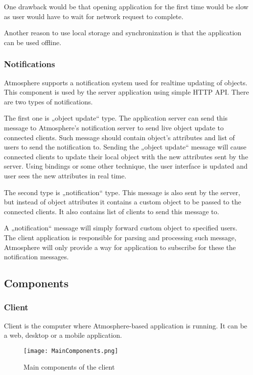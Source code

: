  One drawback would be that opening application for the first time would be slow as user would have to wait for network request to complete. 

Another reason to use local storage and synchronization is that the application can be used offline.

\subsubsection{Notifications}

Atmosphere supports a notification system used for realtime updating of objects. This component is used by the server application using simple HTTP API. There are two types of notifications.

The first one is „object update“ type. The application server can send this  message to Atmosphere’s notification server to send live object update to connected clients. Such message should contain object’s attributes and list of users to send the notification to. Sending the „object update“ message will cause connected clients to update their local object with the new attributes sent by the server. Using bindings or some other technique, the user interface is updated and user sees the new attributes in real time.

The second type is „notification“ type. This message is also sent by the server, but instead of object attributes it contains a custom object to be passed to the connected clients. It also contains list of clients to send this message to. 

A „notification“ message will simply forward custom object to specified users. The client application is responsible for parsing and processing such message, Atmosphere will only provide a way for application to subscribe for these the notification messages. 

\subsection{Components}

\subsubsection{Client}

Client is the computer where Atmosphere-based application is running. It can be a web, desktop or a mobile application.

\begin{figure}[ht!]
\centering
\texttt{[image: MainComponents.png]}
\caption{Main components of the client \label{fig:3}}
\end{figure}

